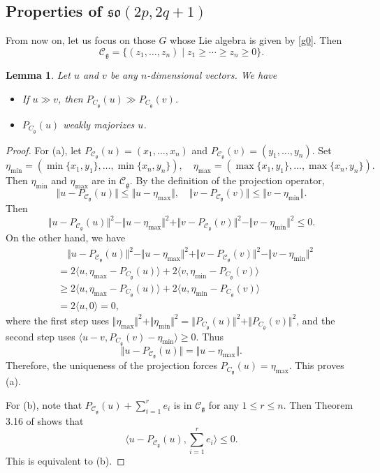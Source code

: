 \documentclass[11pt]{amsart}
\theoremstyle{plain}
\newtheorem{lemma}[thm]{Lemma}
\theoremstyle{definition}
\newcommand{\mfg}{\mathfrak{g}}
\newcommand{\C}{\mathcal{C}}
\begin{document}
\subsection{Properties of $\mathfrak{so}(2p, 2q+1)$}

From now on, let us focus on those $G$ whose Lie algebra is given by \eqref{g0}.
Then
$$
\C_\mfg=\{(z_1,\dots,z_n) \mid z_1\ge\cdots\ge z_n\ge 0\}.
$$

\begin{lemma}\label{Weyl-B}
Let $u$ and $v$ be any $n$-dimensional vectors. We have
	\begin{itemize}
		\item[(a)] If $u\gg v$, then $P_{C_\mfg}(u)\gg P_{C_\mfg}(v)$.
		\item[(b)] $P_{C_\mfg}(u)$ weakly majorizes $u$.
	\end{itemize}
\end{lemma}
\begin{proof} For (a), let $P_{\C_\mfg}(u)=(x_1,\dots,x_n)$ and $P_{\C_\mfg}(v)=(y_1,\dots,y_n)$. Set
	\[\eta_{\mathrm{min}}=(\min\{x_1,y_1\},\dots,\min\{x_n,y_n\}),\quad \eta_{\mathrm{max}}=(\max\{x_1,y_1\},\dots,\max\{x_n,y_n\}).\]
	Then $\eta_{\mathrm{min}}$ and $\eta_{\mathrm{max}}$ are in $\C_\mfg$. By the definition of the projection operator,
	\[\Vert u-P_{\C_\mfg}(u)\Vert\le\Vert u-\eta_{\mathrm{max}}\Vert,\quad \Vert v-P_{\C_\mfg}(v)\Vert\le\Vert v-\eta_{\mathrm{min}}\Vert.\]
	Then
	\[\Vert u-P_{\C_\mfg}(u)\Vert^2-\Vert u-\eta_{\mathrm{max}}\Vert^2+\Vert v-P_{\C_\mfg}(v)\Vert^2-\Vert v-\eta_{\mathrm{min}}\Vert^2\le 0.\]
	On the other hand, we have
	\begin{align*}
		&\quad\Vert u-P_{\C_\mfg}(u)\Vert^2-\Vert u-\eta_{\mathrm{max}}\Vert^2+\Vert v-P_{\C_\mfg}(v)\Vert^2-\Vert v-\eta_{\mathrm{min}}\Vert^2\\
		&=2\langle u,\eta_{\mathrm{max}}-P_{C_\mfg}(u)\rangle+2\langle v,\eta_{\mathrm{min}}-P_{C_\mfg}(v)\rangle\\
		&\ge 2\langle u,\eta_{\mathrm{max}}-P_{C_\mfg}(u)\rangle+2\langle u,\eta_{\mathrm{min}}-P_{C_\mfg}(v)\rangle\\
		&=2\langle u,0\rangle=0,
	\end{align*}
where the first step uses $\Vert \eta_{\max}\Vert^2+\Vert \eta_{\mathrm{min}}\Vert^2=\Vert P_{C_\mfg}(u)\Vert^2+\Vert P_{C_\mfg}(v)\Vert^2$, and the second step uses $\langle u-v,P_{C_\mfg}(v)-\eta_{\mathrm{min}} \rangle\ge 0$. Thus
	\[\Vert u-P_{\C_\mfg}(u)\Vert=\Vert u-\eta_{\mathrm{max}}\Vert.\]
	Therefore, the uniqueness of the projection forces $P_{C_\mfg}(u)=\eta_{\mathrm{max}}$. This proves (a).
	
	For (b), note that $P_{\C_\mfg}(u)+\sum_{i=1}^re_i$ is in $\C_\mfg$ for any $1\le r\le n$. Then Theorem 3.16 of \cite{BC} shows that
	\[\langle u-P_{\C_\mfg}(u), \sum_{i=1}^re_i\rangle\le 0.\]
	This is equivalent to (b).
\end{proof}
\end{document}
